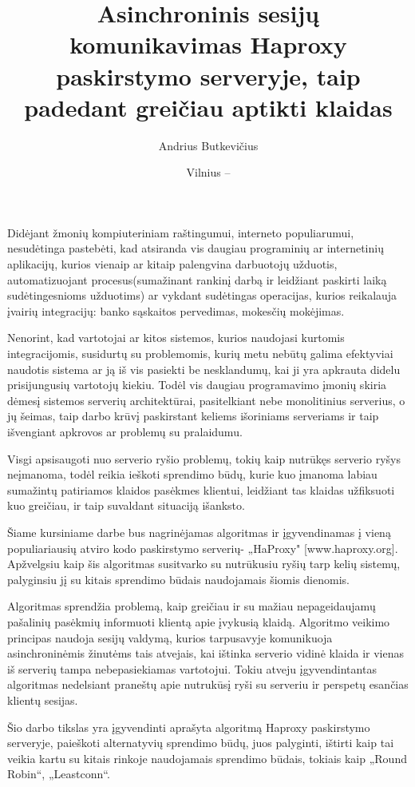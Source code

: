 \documentclass{VUMIFPSkursinis}
\title{Asinchroninis sesijų komunikavimas Haproxy paskirstymo serveryje, taip padedant greičiau aptikti klaidas}
\author{Andrius Butkevičius}
\date{Vilnius – \the\year}
\begin{document}
\maketitle

\tableofcontents

	Didėjant žmonių kompiuteriniam raštingumui, interneto populiarumui, nesudėtinga pastebėti, kad atsiranda vis daugiau programinių ar internetinių aplikacijų, kurios vienaip ar kitaip palengvina darbuotojų užduotis, automatizuojant procesus(sumažinant rankinį darbą ir leidžiant paskirti laiką sudėtingesnioms užduotims) ar vykdant sudėtingas operacijas, kurios reikalauja įvairių integracijų: banko sąskaitos pervedimas, mokesčių mokėjimas.

	Nenorint, kad vartotojai ar kitos sistemos, kurios naudojasi kurtomis integracijomis, susidurtų su problemomis, kurių metu nebūtų galima efektyviai naudotis sistema ar ją iš vis pasiekti be nesklandumų, kai ji yra apkrauta didelu prisijungusių vartotojų kiekiu. Todėl vis daugiau programavimo įmonių skiria dėmesį sistemos serverių architektūrai, pasitelkiant nebe monolitinius serverius, o jų šeimas, taip darbo krūvį paskirstant keliems išoriniams serveriams ir taip išvengiant apkrovos ar problemų su pralaidumu.

	Visgi apsisaugoti nuo serverio ryšio problemų, tokių kaip nutrūkęs serverio ryšys neįmanoma, todėl reikia ieškoti sprendimo būdų, kurie kuo įmanoma labiau sumažintų patiriamos klaidos pasėkmes klientui, leidžiant tas klaidas užfiksuoti kuo greičiau, ir taip suvaldant situaciją išanksto.

	Šiame kursiniame darbe bus nagrinėjamas algoritmas ir įgyvendinamas į vieną populiariausių atviro kodo paskirstymo serverių-  „HaProxy" [www.haproxy.org]. Apžvelgsiu kaip šis algoritmas susitvarko su nutrūkusiu ryšių tarp kelių sistemų, palyginsiu jį su kitais sprendimo būdais naudojamais šiomis dienomis.

	Algoritmas sprendžia problemą, kaip greičiau ir su mažiau nepageidaujamų pašalinių pasėkmių informuoti klientą apie įvykusią klaidą. Algoritmo veikimo principas naudoja sesijų valdymą, kurios tarpusavyje komunikuoja asinchroninėmis žinutėms tais atvejais, kai ištinka serverio vidinė klaida ir vienas iš serverių tampa nebepasiekiamas vartotojui. Tokiu atveju įgyvendintantas algoritmas nedelsiant praneštų apie nutrukūsį ryši su serveriu ir perspetų esančias klientų sesijas.

	 Šio darbo tikslas yra įgyvendinti aprašyta algoritmą Haproxy paskirstymo serveryje, paieškoti alternatyvių sprendimo būdų, juos palyginti, ištirti kaip tai veikia kartu su kitais rinkoje naudojamais sprendimo būdais, tokiais kaip „Round Robin“, „Leastconn“.
\end{document}
